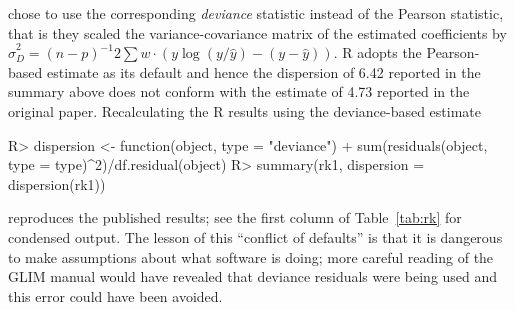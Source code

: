 \documentclass[10pt,a4paper,twoside]{article}
\let\proglang=\textsf
\newenvironment{Schunk}{}{}
\begin{document}
chose to use the corresponding \emph{deviance} statistic instead of the 
Pearson statistic, that is
they scaled the variance-covariance matrix of the estimated coefficients by
$\hat \sigma_D^2 = (n-p)^{-1} 2 \sum w \cdot (y \log(y/\hat y) - (y - \hat y))$.
\proglang{R} adopts the Pearson-based estimate as its default and hence the
dispersion of 6.42
reported in the summary above does not conform with the estimate of
4.73 reported in the 
original paper.  Recalculating the \proglang{R} results using the
deviance-based estimate
%
\begin{Schunk}
\begin{Sinput}
R> dispersion <- function(object, type = "deviance")
+    sum(residuals(object, type = type)^2)/df.residual(object)
R> summary(rk1, dispersion = dispersion(rk1))
\end{Sinput}
\end{Schunk}
%
reproduces the published results; see the first column of Table~\ref{tab:rk} for condensed output.
The lesson of this ``conflict of defaults'' is that it is dangerous  to make assumptions about
what software is doing; more careful reading of the \proglang{GLIM} manual would have
revealed that deviance residuals were being used and this error could have been
avoided.
\end{document}
